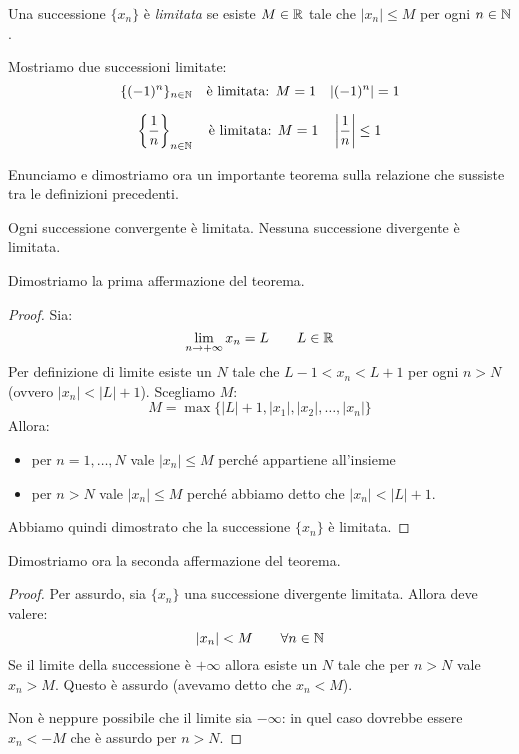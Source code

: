 \begin{definition}
Una successione $\{x_n\}$ è \emph{limitata} se esiste $M \in \mathbb R$ tale che $|x_n| \le M$ per ogni $n \in \mathbb N$.
\end{definition}

\begin{example}
Mostriamo due successioni limitate:
\begin{equation*}
\{(-1)^n\}_{n \in \mathbb N} \quad \text{è limitata: } M = 1 \quad |(-1)^n| = 1
\end{equation*}

\begin{equation*}
\left\{ \frac{1}{n} \right\}_{n \in \mathbb N} \quad \text{è limitata: } M = 1 \quad \left|\frac{1}{n}\right| \le 1
\end{equation*}
\end{example}

Enunciamo e dimostriamo ora un importante teorema sulla relazione che sussiste tra le definizioni precedenti.
\begin{theorem}
Ogni successione convergente è limitata. Nessuna successione divergente è limitata.
\end{theorem}
Dimostriamo la prima affermazione del teorema.
\begin{proof}
Sia:
\begin{equation*}
\lim_{n \to +\infty} x_n = L \qquad L \in \mathbb R
\end{equation*}
Per definizione di limite esiste un $N$ tale che $L - 1 < x_n < L + 1$ per ogni $n > N$ (ovvero $|x_n| < |L| + 1$).
Scegliamo $M$:
\begin{equation*}
M = \max\{|L|+1, |x_1|, |x_2|, \ldots, |x_n|\}
\end{equation*}
Allora:
\begin{itemize}
\item per $n = 1, \ldots, N$ vale $|x_n| \le M$ perché appartiene all'insieme
\item per $n > N$ vale $|x_n| \le M$ perché abbiamo detto che $|x_n| < |L| + 1$.
\end{itemize}
Abbiamo quindi dimostrato che la successione $\{x_n\}$ è limitata.
\end{proof}
Dimostriamo ora la seconda affermazione del teorema.
\begin{proof}
Per assurdo, sia $\{x_n\}$ una successione divergente limitata. Allora deve valere:
\begin{equation*}
|x_n| < M \qquad \forall n \in \mathbb N
\end{equation*}
Se il limite della successione è $+\infty$ allora esiste un $N$ tale che per $n > N$ vale $x_n > M$. Questo è assurdo (avevamo detto che $x_n < M$).

Non è neppure possibile che il limite sia $-\infty$: in quel caso dovrebbe essere $x_n < -M$ che è assurdo per $n > N$.
\end{proof}

